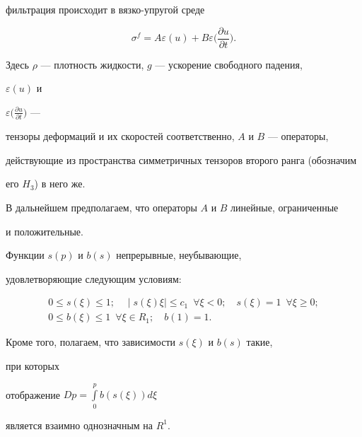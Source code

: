 фильтрация происходит в вязко-упругой среде


\begin{equation}


\sigma^{f} = A \varepsilon (u) + B \varepsilon \bigg


(\frac{\partial u} {\partial t} \bigg) .


\label{eq4}


\end{equation}


Здесь $\rho$ --- плотность жидкости, $g$ --- ускорение свободного падения,


$\varepsilon (u)$ и


$\varepsilon\big(\frac{\partial u}{\partial t}\big)$ ---


тензоры деформаций и их скоростей соответственно, $A$ и $B$ --- операторы,


действующие из пространства симметричных тензоров второго ранга (обозначим


его $H_{3}$) в него же.





В дальнейшем предполагаем, что операторы $A$ и $B$ линейные, ограниченные


и положительные.


Функции $s(p)$ и $b(s)$ непрерывные, неубывающие,


удовлетворяющие следующим условиям:


\begin{gather}


0 \leq s(\xi) \leq 1; \quad \mid s(\xi)\xi \mid \leq c_{1} 


\ \; \forall \xi < 0; \quad s(\xi) = 1\ \; \forall \xi \geq 0 ;


\label{eq4.1} \\


%


0 \leq b(\xi) \leq 1\ \; \forall \xi


\in R_{1}; \quad b(1)=1.


\label{eq4.2}


\end{gather}


Кроме того, полагаем, что зависимости $s(\xi)$ и $b(s)$ такие,


при которых


отображение $D p = \int \limits^{p}_{0} b(s(\xi)) d \xi$


является взаимно однозначным на $R^{1}$.






